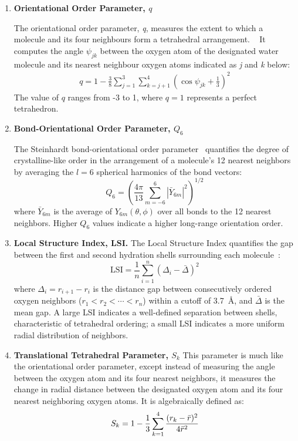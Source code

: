 \documentclass[aps, amsmath,amssymb, reprint, onecolumn,notitlepage,superscriptaddress]{revtex4-2}
\begin{document}
\begin{enumerate}
\item \textbf{Orientational Order Parameter, $q$}

The orientational order parameter, \textit{q}, measures the extent to which a molecule and its four neighbours form a tetrahedral arrangement. ~\cite{chau_new_1998, errington_relationship_2001} It computes the angle $\psi_{jk}$ between the oxygen atom of the designated water molecule and its nearest neighbour oxygen atoms indicated as \textit{j} and \textit{k} below:
\begin{align}
q= 1 -\frac{3}{8}\sum_{j=1}^3 \sum_{k=j+1}^4{\left(\cos{\psi_{jk}}+ \frac{1}{3}\right)}^2
\end{align}
The value of $q$ ranges from -3 to 1, where $q=1$ represents a perfect tetrahedron.

\item \textbf{Bond-Orientational Order Parameter, $Q_6$}

The Steinhardt bond-orientational order parameter~\cite{steinhardt_bond-orientational_1983} quantifies the degree of crystalline-like order in the arrangement of a molecule's 12 nearest neighbors by averaging the $l = 6$ spherical harmonics of the bond vectors:
\begin{equation}
Q_6 = \left(\frac{4\pi}{13}\sum_{m=-6}^{6}\left|\bar{Y}_{6m}\right|^{2}\right)^{1/2}
\label{eq:Q6}
\end{equation}
where $\bar{Y}_{6m}$ is the average of $Y_{6m}(\theta, \phi)$ over all bonds to the 12 nearest neighbors. Higher $Q_6$ values indicate a higher long-range orientation order.

\item \textbf{Local Structure Index, LSI.}
The Local Structure Index quantifies the gap between the first and second hydration shells surrounding each molecule~\cite{shiratani_growth_1996}:
\begin{equation}
\text{LSI} = \frac{1}{n}\sum_{i=1}^{n}\left(\Delta_i - \bar{\Delta}\right)^{2}
\label{eq:LSI}
\end{equation}
where $\Delta_i = r_{i+1} - r_i$ is the distance gap between consecutively ordered oxygen neighbors ($r_1 < r_2 < \cdots < r_n$) within a cutoff of 3.7~\AA, and $\bar{\Delta}$ is the mean gap. A large LSI indicates a well-defined separation between shells, characteristic of tetrahedral ordering; a small LSI indicates a more uniform radial distribution of neighbors.

\item \textbf{Translational Tetrahedral Parameter, $S_k$}
This parameter is much like the orientational order parameter, except instead of measuring the angle between the oxygen atom and its four nearest neighbors, it measures the change in radial distance between the designated oxygen atom and its four nearest neighboring oxygen atoms. It is algebraically defined as:
\begin{align}
S_k= 1 -\frac{1}{3}\sum_{k=1}^4 \frac{(r_k - \Bar{r})^2}{4\Bar{r}^2}
\end{align}


\end{enumerate}
\end{document}
